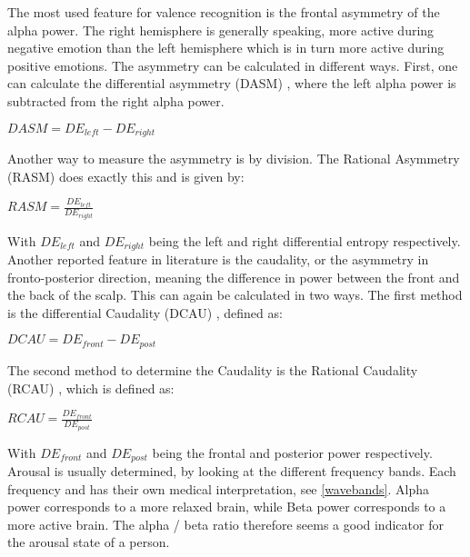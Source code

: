 \npar

The most used feature for valence recognition is the frontal asymmetry of the alpha power\cite{GivenPaper}. The right hemisphere is generally speaking, more active during negative emotion than the left hemisphere which is in turn more active during positive emotions\cite{RealTimeEEGEmotion,EEGDatasets,killyPaper}. The asymmetry can be calculated in different ways. First, one can calculate the differential asymmetry (DASM) , where the left alpha power is subtracted from the right alpha power.

\begin{center}
$DASM = DE_{left} - DE_{right}$
\end{center}

Another way to measure the asymmetry is by division. The Rational Asymmetry (RASM)  does exactly this and is given by: \\

\begin{center}
$RASM = \frac{DE_{left}}{DE_{right}}$
\end{center}

With $DE_{left}$ and $DE_{right}$ being the left and right differential entropy respectively. Another reported feature in literature is the caudality, or the asymmetry in fronto-posterior direction\cite{caudality}, meaning the difference in power between the front and the back of the scalp. This can again be calculated in two ways. The first method is the differential Caudality (DCAU) , defined as: \\

\begin{center}
$DCAU = DE_{front} - DE_{post}$
\end{center}

The second method to determine the Caudality is the Rational Caudality (RCAU) , which is defined as:

\begin{center}
$RCAU = \frac{DE_{front}}{DE_{post}}$
\end{center}

With $DE_{front}$ and $DE_{post}$ being the frontal and posterior power respectively. Arousal is usually determined, by looking at the different frequency bands\citep{ExtendedPaper}. Each frequency and has their own medical interpretation, see \ref{wavebands}. Alpha power corresponds to a more relaxed brain, while Beta power corresponds to a more active brain. The alpha / beta ratio therefore seems a good indicator for the arousal state of a person.

